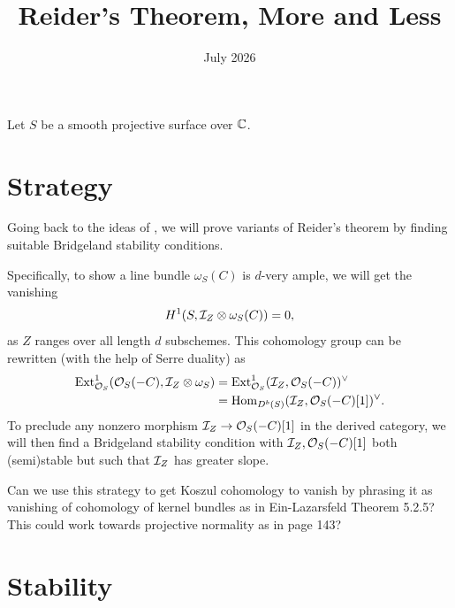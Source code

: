 \documentclass[12pt]{article}
\title{Reider's Theorem, More and Less}
\author{}
\date{July 2026}
\begin{document}
\maketitle

Let $S$ be a smooth projective surface over $\mathbb{C}$.

\section{Strategy}

Going back to the ideas of \cite{arcara_reiders_2009}, we will prove variants of Reider's theorem by finding suitable Bridgeland stability conditions.

Specifically, to show a line bundle $\omega_S(C)$ is $d$-very ample, we will get the vanishing
\[H^1(S,\mathcal{I}_Z \otimes \omega_S(C)) = 0,\]
as $Z$ ranges over all length $d$ subschemes. This cohomology group can be rewritten (with the help of Serre duality) as
\begin{align*}
    \mathrm{Ext}_{\mathcal{O}_S}^1(\mathcal{O}_S(-C),\mathcal{I}_Z \otimes \omega_S) &= \mathrm{Ext}_{\mathcal{O}_S}^1(\mathcal{I}_Z, \mathcal{O}_S(-C))^\vee\\
    &= \mathrm{Hom}_{D^b(S)}(\mathcal{I}_Z, \mathcal{O}_S(-C)[1])^\vee.
\end{align*}
To preclude any nonzero morphism $\mathcal{I}_Z\to \mathcal{O}_S(-C)[1]$ in the derived category, we will then find a Bridgeland stability condition with $\mathcal{I}_Z,\mathcal{O}_S(-C)[1]$ both (semi)stable but such that $\mathcal{I}_Z$ has greater slope.

{\color{red} Can we use this strategy to get Koszul cohomology to vanish by phrasing it as vanishing of cohomology of kernel bundles as in Ein-Lazarsfeld Theorem 5.2.5? This could work towards projective normality as in page 143?}

\section{Stability}
\end{document}
